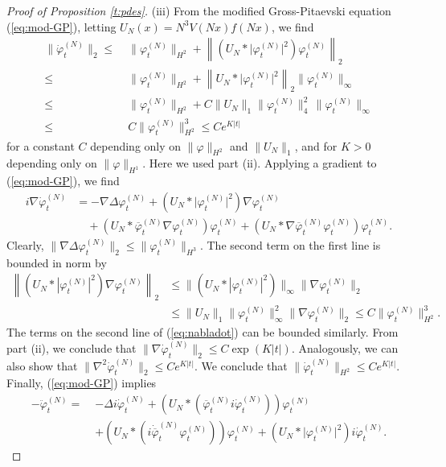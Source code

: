 \documentclass[11pt,a4paper]{article}
\newcommand{\norm}[1]{\lVert#1\rVert}	%
\newcommand{\ph}{\varphi_t^{(N)}}	%
\newcommand{\phdot}{\dot{\varphi}_t^{(N)}}	%
\newcommand{\phddot}{\ddot{\varphi}_t^{(N)}}	%
\begin{document}
\begin{proof}[Proof of Proposition \ref{t:pdes}]
(iii) {F}rom the modified Gross-Pitaevski equation (\ref{eq:mod-GP}), letting $U_N (x) = N^3 V(Nx) f(Nx)$, we find
\[ \begin{split}
\norm{\phdot}_{2} \leq \; & \norm{\ph}_{H^2} + \left\| \left(U_N * \lvert \ph\rvert^2 \right)\ph \right\|_2 \\  \leq \; & \norm{\ph}_{H^2} + \left\| U_N * \lvert \ph\rvert^2 \right\|_2 \| \ph \|_\infty \\ \leq \; &
 \norm{\ph}_{H^2} + C \| U_N \|_1 \| \ph \|_4^2 \, \| \ph \|_\infty \\ \leq \;  &C \| \ph \|_{H^2}^3 \leq C e^{K |t|} 
\end{split} \]
for a constant $C$ depending only on $\| \varphi \|_{H^2}$ and $\| U_N \|_1$, and for $K >0$ depending only on $\| \varphi \|_{H^1}$. Here we used part (ii). Applying a gradient to (\ref{eq:mod-GP}), we find 
\begin{equation}\label{eq:nabladot} \begin{split}
i \nabla \phdot & = - \nabla \Delta \ph + \left( U_N \ast \lvert \ph \rvert^2 \right) \nabla \ph \\
& \quad + \left( U_N \ast \overline{\varphi}_t^{(N)} \nabla \ph \right) \ph + \left( U_N \ast  \nabla \overline{\varphi}_t^{(N)} \ph \right) \ph. 
\end{split} \end{equation}
Clearly, $\norm{\nabla \Delta \ph}_{2} \leq \norm{\ph}_{H^3}$. The second term on the first line is bounded in norm by
\[\begin{split}  \left\| (U_N * |\varphi_t^{(N)}|^2) \nabla \ph \right\|_2 &
\leq \| (U_N * |\varphi_t^{(N)}|^2)  \|_{\infty}   \| \nabla \ph \|_2 \\
&\leq  \|U_N\|_1 \|\varphi_t^{(N)}\|_\infty^2    \| \nabla \ph \|_2 \leq C
\| \ph \|_{H^2}^3. \end{split} \]
The terms on the second line of (\ref{eq:nabladot}) can be bounded similarly. {F}rom part (ii), we conclude that $\| \nabla \dot{\varphi}_t^{(N)} \|_2 \leq C \exp (K |t|)$. Analogously, we can also show that $\| \nabla^2 \dot{\varphi}_t^{(N)} \|_2 \leq C e^{K |t|}$. We conclude that $\| \dot{\varphi}^{(N)}_t\|_{H^2} \leq C e^{K |t|}$. Finally, (\ref{eq:mod-GP}) implies 
\[ \begin{split}
-\phddot  = \; &-\Delta i \phdot + \left( U_N \ast (\overline{\varphi}_t^{(N)} i \phdot)\right) \ph \\
&+ \left( U_N \ast (i\dot{\overline{\varphi}}_t^{(N)} \ph) \right) \ph + \left( U_N \ast \lvert\ph\rvert^2 \right) i \phdot.

\end{split}\]
\end{proof}
\end{document}
